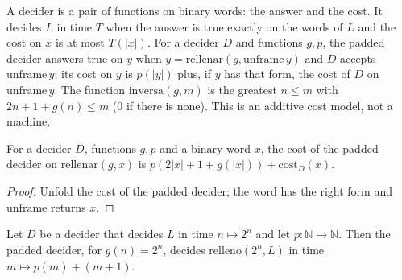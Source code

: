 \begin{definition}
  \label{def:structure-decisor}
  \leanok
  A decider is a pair of functions on binary words: the answer and the cost. It decides $L$ in time $T$
  when the answer is $\mathrm{true}$ exactly on the words of $L$ and the cost on $x$ is at most
  $T(|x|)$. For a decider $D$ and functions $g, p$, the padded decider answers $\mathrm{true}$ on $y$
  when $y = \mathrm{rellenar}(g, \mathrm{unframe}\,y)$ and $D$ accepts $\mathrm{unframe}\,y$; its cost on
  $y$ is $p(|y|)$ plus, if $y$ has that form, the cost of $D$ on $\mathrm{unframe}\,y$. The function
  $\mathrm{inversa}(g, m)$ is the greatest $n \le m$ with $2n + 1 + g(n) \le m$ ($0$ if there is
  none). This is an additive cost model, not a machine.
  \own{}
\end{definition}

\begin{theorem}
  \label{thm:structure-trabajo}
  \leanok
  For a decider $D$, functions $g, p$ and a binary word $x$, the cost of the padded decider on
  $\mathrm{rellenar}(g, x)$ is $p(2|x| + 1 + g(|x|)) + \mathrm{cost}_D(x)$.
  \own{}
\end{theorem}

\begin{proof}
  \leanok
  Unfold the cost of the padded decider; the word has the right form and $\mathrm{unframe}$ returns
  $x$.
\end{proof}

\begin{theorem}
  \label{thm:structure-traslacion-exp}
  \leanok
  Let $D$ be a decider that decides $L$ in time $n \mapsto 2^n$ and let $p : \mathbb{N} \to
  \mathbb{N}$. Then the padded decider, for $g(n) = 2^n$, decides $\mathrm{relleno}(2^n, L)$ in time
  $m \mapsto p(m) + (m + 1)$.
  \own{}
\end{theorem}

